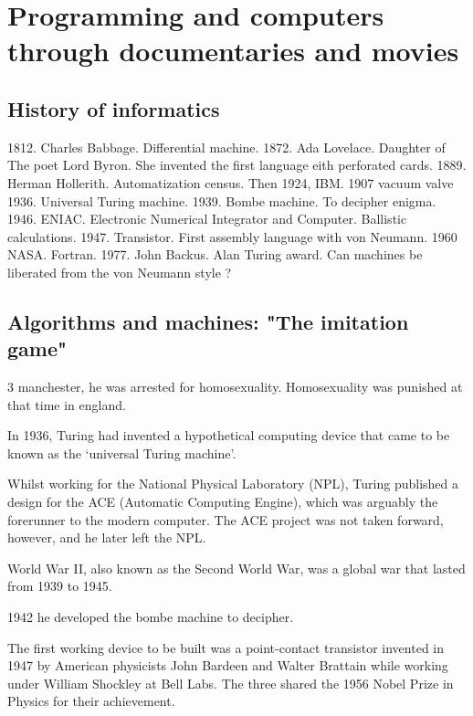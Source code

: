 
 

\chapter{Programming and computers through documentaries and movies} 

    
      
 \section{History of informatics}
      1812. Charles Babbage. Differential machine. 
      1872. Ada Lovelace. Daughter of The poet Lord Byron. She invented the first language eith perforated cards. 
      1889. Herman Hollerith. Automatization census. Then 1924, IBM.
      1907 vacuum valve 
      1936. Universal Turing machine. 
      1939. Bombe machine. To decipher enigma. 
      1946. ENIAC. Electronic Numerical Integrator and Computer. Ballistic calculations. 
      1947. Transistor. First assembly language with von Neumann. 
      1960 NASA. Fortran. 
      1977. John Backus. Alan Turing award. Can machines be liberated from the von Neumann style ? 
       
 
  \section{Algorithms and machines: "The imitation game"} 
  
  3 manchester, he was arrested for homosexuality. Homosexuality was punished at that time in england. 
  
  In 1936, Turing had invented a hypothetical computing device that came to be known as the ‘universal Turing machine’. 
  
  Whilst working for the National Physical Laboratory (NPL), Turing published a design for the ACE (Automatic Computing Engine), which was 
  arguably the forerunner to the modern computer. The ACE project was not taken forward, however, and he later left the NPL.
  
   World War II, also known as the Second World War, was a global war that lasted from 1939 to 1945.
  
  1942 he developed the bombe machine to decipher. 
  
  
  The first working device to be built was a point-contact transistor invented in 1947 by American physicists John Bardeen and Walter 
  Brattain 
  while working under William Shockley at Bell Labs. The three shared the 1956 Nobel Prize in Physics for their achievement.
  
